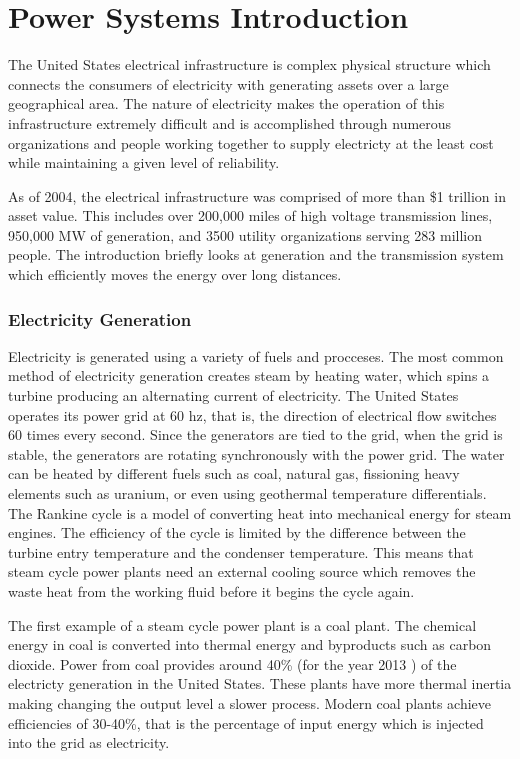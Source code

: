 \section{Power Systems Introduction}
The United States electrical infrastructure is complex physical structure which connects the consumers of electricity with generating assets over a large geographical area.  The nature of electricity makes the operation of this infrastructure extremely difficult and is accomplished through numerous organizations and people working together to supply electricty at the least cost while maintaining a given level of reliability.

	As of 2004, the electrical infrastructure was comprised of more than \$1 trillion in asset value.  This includes over 200,000 miles of high voltage transmission lines, 950,000 MW of generation, and 3500 utility organizations serving 283 million people.\cite{northeast_2003}  The introduction briefly looks at generation and the transmission system which efficiently moves the energy over long distances.

\subsubsection{Electricity Generation}
	Electricity is generated using a variety of fuels and procceses.  The most common method of electricity generation creates steam by heating water, which spins a turbine producing an alternating current of electricity.  The United States operates its power grid at 60 hz, that is, the direction of electrical flow switches 60 times every second.  Since the generators are tied to the grid, when the grid is stable, the generators are rotating synchronously with the power grid.  The water can be heated by different fuels such as coal, natural gas, fissioning heavy elements such as uranium, or even using geothermal temperature differentials.  The Rankine cycle is a model of converting heat into mechanical energy for steam engines.  The efficiency of the cycle is limited by the difference between the turbine entry temperature and the condenser temperature.  This means that steam cycle power plants need an external cooling source which removes the waste heat from the working fluid before it begins the cycle again.  

	The first example of a steam cycle power plant is a coal plant.  The chemical energy in coal is converted into thermal energy and byproducts such as carbon dioxide.  Power from coal provides around 40\% (for the year 2013 \cite{eia_gov}) of the electricty generation in the United States. These plants have more thermal inertia making changing the output level a slower process.  Modern coal plants achieve efficiencies of 30-40\%, that is the percentage of input energy which is injected into the grid as electricity.


